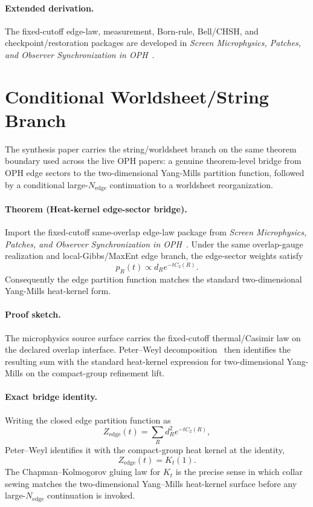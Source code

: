 \paragraph{Extended derivation.}
The fixed-cutoff edge-law, measurement, Born-rule, Bell/CHSH, and checkpoint/restoration packages are developed in
\emph{Screen Microphysics, Patches, and Observer Synchronization in OPH}~\cite{ophmicrophysics}.

\section{Conditional Worldsheet/String Branch}

The synthesis paper carries the string/worldsheet branch on the same theorem boundary used across
the live OPH papers: a genuine theorem-level bridge from OPH edge sectors to the two-dimensional
Yang-Mills partition function, followed by a conditional large-\(N_{\mathrm{edge}}\) continuation
to a worldsheet reorganization.

\paragraph{Theorem (Heat-kernel edge-sector bridge).}
Import the fixed-cutoff same-overlap edge-law package from
\emph{Screen Microphysics, Patches, and Observer Synchronization in OPH}~\cite{ophmicrophysics}.
Under the same overlap-gauge realization and local-Gibbs/MaxEnt edge branch, the edge-sector
weights satisfy
\[
p_R(t)\propto d_R e^{-t C_2(R)}.
\]
Consequently the edge partition function matches the standard two-dimensional Yang-Mills
heat-kernel form.

\paragraph{Proof sketch.}
The microphysics source surface carries the fixed-cutoff thermal/Casimir law on the declared
overlap interface. Peter--Weyl decomposition~\cite{peterWeyl27}
then identifies the resulting sum with the standard heat-kernel expression for
two-dimensional Yang-Mills on the compact-group refinement lift.

\paragraph{Exact bridge identity.}
Writing the closed edge partition function as
\[
Z_{\mathrm{edge}}(t)=\sum_R d_R^2 e^{-tC_2(R)},
\]
Peter--Weyl identifies it with the compact-group heat kernel at the identity,
\[
Z_{\mathrm{edge}}(t)=K_t(1).
\]
The Chapman--Kolmogorov gluing law for \(K_t\) is the precise sense in which collar sewing
matches the two-dimensional Yang--Mills heat-kernel surface before any large-\(N_{\mathrm{edge}}\)
continuation is invoked.

